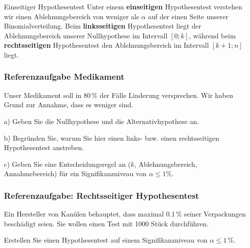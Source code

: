 \begin{definition}{Einseitiger Hypothesentest}{}
Unter einem \textbf{einseitigen} Hypothesentest verstehen wir einen Ablehnungsbereich von weniger als $\alpha$ auf der einen Seite unserer Binomialverteilung. Beim \textbf{linksseitigen} Hypothesentest liegt der Ablehnungsbereich unserer Nullhypothese im Intervall $[0; k]$, während beim \textbf{rechtsseitigen} Hypothesentest den Ablehnungsbereich im Intervall $[k+1;n]$ liegt.
  \end{definition}


\newpage
\subsubsection{Referenzaufgabe Medikament}
Unser Medikament soll in 80\,\% der Fälle Linderung versprechen. Wir haben Grund zur Annahme, dass es weniger sind.

a) Geben Sie die Nullhypothese und die Alternativhypothese an.


b) Begründen Sie, warum Sie hier einen links- bzw. einen rechtsseitigen Hypothesentest anstreben.


c) Geben Sie eine Entscheidungsregel an ($k$, Ablehnungsbereich, Annahmebereich) für ein Signifikanzniveau von $\alpha \le 1\%$.



\newpage
\subsubsection{Referenzaufgabe: Rechtsseitiger Hypothesentest}
Ein Hersteller von Kanülen behauptet, dass maximal 0.1\,\% seiner Verpackungen beschädigt seien. Sie wollen einen Test mit 1000 Stück durchführen.

Erstellen Sie einen Hypothesentest auf einem Signifikanzniveau von $\alpha \le 1\,\%$.

